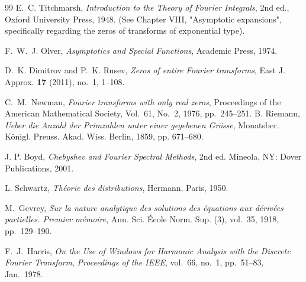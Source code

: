 \documentclass[11pt]{article}
\theoremstyle{breakdef}
\begin{document}
\begin{thebibliography}{99}
E.~C. Titchmarsh,
\emph{Introduction to the Theory of Fourier Integrals},
2nd ed., Oxford University Press, 1948.
(See Chapter VIII, "Asymptotic expansions", specifically regarding the zeros of transforms of exponential type).

F.~W.~J. Olver,
\emph{Asymptotics and Special Functions},
Academic Press, 1974.

D.~K. Dimitrov and P.~K. Rusev,
\textit{Zeros of entire Fourier transforms},
East J. Approx. \textbf{17} (2011), no.~1, 1--108.

C.~M.~Newman,
\emph{Fourier transforms with only real zeros},
Proceedings of the American Mathematical Society, Vol.~61, No.~2, 1976, pp.~245--251.
B. Riemann, 
\textit{Ueber die Anzahl der Primzahlen unter einer gegebenen Gr\"osse}, 
Monatsber. K\"onigl. Preuss. Akad. Wiss. Berlin, 1859, pp. 671--680.

J. P. Boyd, \emph{Chebyshev and Fourier Spectral Methods}, 2nd ed. Mineola, NY: Dover Publications, 2001.

L. Schwartz, \textit{Théorie des distributions}, Hermann, Paris, 1950.

M.~Gevrey,
\emph{Sur la nature analytique des solutions des \'equations aux d\'eriv\'ees partielles. Premier m\'emoire},
Ann. Sci. \'Ecole Norm. Sup. (3), vol.~35, 1918, pp.~129--190.

F.~J.~Harris,
\emph{On the Use of Windows for Harmonic Analysis with the Discrete {Fourier} Transform},
\textit{Proceedings of the {IEEE}}, vol.~66, no.~1, pp.~51--83, Jan.\ 1978.

\end{thebibliography}
\end{document}

